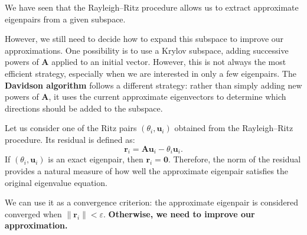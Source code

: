\documentclass[10pt,aspectratio=169]{beamer}
\begin{document}
\begin{frame}
	We have seen that the Rayleigh--Ritz procedure allows us to extract approximate eigenpairs from a given subspace.
	
	\medskip
	However, we still need to decide how to expand this subspace to improve our approximations.
	One possibility is to use a Krylov subspace, adding successive powers of $\mathbf A$ applied to an initial vector. However, this is not always the most efficient strategy, especially when we are interested in only a few eigenpairs.
	The \textbf{Davidson algorithm} follows a different strategy: rather than simply adding new powers of $\mathbf A$, it uses the current approximate eigenvectors to determine which directions should be added to the subspace.
	
	\pause
	\medskip
	Let us consider one of the Ritz pairs $(\theta_i,\mathbf u_i)$ obtained from the Rayleigh--Ritz procedure. Its residual is defined as:
	\begin{equation*}
		\mathbf r_i=\mathbf A\mathbf u_i-\theta_i\mathbf u_i.
	\end{equation*}
	If $(\theta_i,\mathbf u_i)$ is an exact eigenpair, then $\mathbf r_i=\mathbf 0$. Therefore, the norm of the residual provides a natural measure of how well the approximate eigenpair satisfies the original eigenvalue equation.
	
	\medskip
	We can use it as a convergence criterion: the approximate eigenpair is considered converged when $\|\mathbf r_i\|<\varepsilon$. \textbf{Otherwise, we need to improve our approximation.}
\end{frame}
\end{document}
